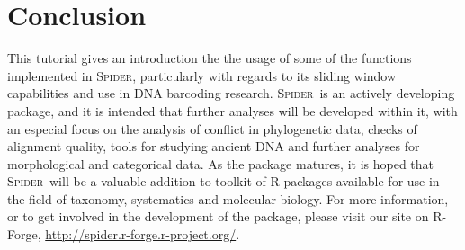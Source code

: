 \documentclass{article}
\newcommand{\spider}{\textsc{Spider}~} %
\newcommand{\Spider}{\textsc{Spider}} %
\newcommand{\progname}[1]{\textsc{#1}}
\begin{document}
\section{Conclusion}
This tutorial gives an introduction the the usage of some of the functions implemented in \Spider, particularly with regards to its sliding window capabilities and use in DNA barcoding research. 
\spider is an actively developing package, and it is intended that further analyses will be developed within it, with an especial focus on the analysis of conflict in phylogenetic data, checks of alignment quality, tools for studying ancient DNA and further analyses for morphological and categorical data.
As the package matures, it is hoped that \spider will be a valuable addition to toolkit of \progname{R} packages available for use in the field of taxonomy, systematics and molecular biology. For more information, or to get involved in the development of the package, please visit our site on R-Forge, \href{http://spider.r-forge.r-project.org/}{http://spider.r-forge.r-project.org/}.




\end{document}
